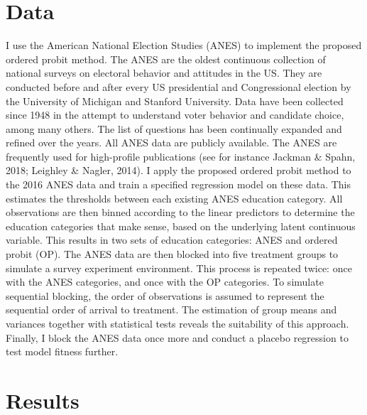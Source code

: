 \documentclass[12pt,econ]{sources/authesis}
\begin{document}
\hypertarget{ordblock-data}{%
\section{Data}\label{ordblock-data}}

I use the American National Election Studies (ANES) to implement the proposed ordered probit method. The ANES are the oldest continuous collection of national surveys on electoral behavior and attitudes in the US. They are conducted before and after every US presidential and Congressional election by the University of Michigan and Stanford University. Data have been collected since 1948 in the attempt to understand voter behavior and candidate choice, among many others. The list of questions has been continually expanded and refined over the years. All ANES data are publicly available. The ANES are frequently used for high-profile publications (see for instance Jackman \& Spahn, 2018; Leighley \& Nagler, 2014). I apply the proposed ordered probit method to the 2016 ANES data and train a specified regression model on these data. This estimates the thresholds between each existing ANES education category. All observations are then binned according to the linear predictors to determine the education categories that make sense, based on the underlying latent continuous variable. This results in two sets of education categories: ANES and ordered probit (OP). The ANES data are then blocked into five treatment groups to simulate a survey experiment environment. This process is repeated twice: once with the ANES categories, and once with the OP categories. To simulate sequential blocking, the order of observations is assumed to represent the sequential order of arrival to treatment. The estimation of group means and variances together with statistical tests reveals the suitability of this approach. Finally, I block the ANES data once more and conduct a placebo regression to test model fitness further.

\hypertarget{ordblock-results}{%
\section{Results}\label{ordblock-results}}
\end{document}
